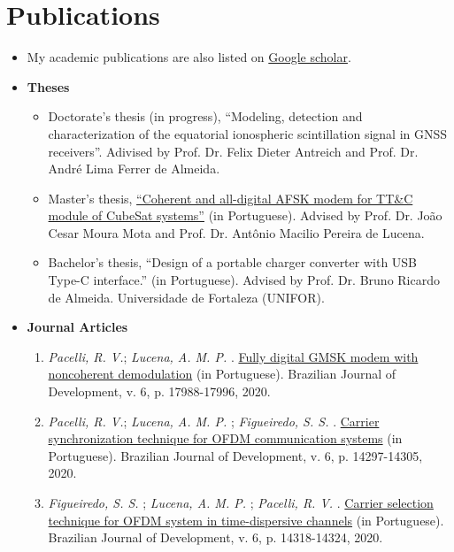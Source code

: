 \section{Publications}

\begin{itemize}[leftmargin=0.15in, label={}] %
    \item My academic publications are also listed on \href{https://scholar.google.com.br/citations?user=Kj6Gzs4AAAAJ&hl=pt-BR&oi=sra}{Google scholar}.
    \item \textbf{Theses}
    \begin{itemize}%
        \item Doctorate's thesis (in progress), ``Modeling, detection and characterization of the equatorial ionospheric scintillation signal in GNSS receivers''. Adivised by Prof. Dr. Felix Dieter Antreich and Prof. Dr. André Lima Ferrer de Almeida.
        \item Master's thesis, \href{http://repositorio.ufc.br/bitstream/riufc/60259/1/2021_dis_rvpacelli.pdf}{``Coherent and all-digital AFSK modem for TT\&C module of CubeSat systems''} (in Portuguese). Advised by Prof. Dr. João Cesar Moura Mota and Prof. Dr. Antônio Macilio Pereira de Lucena.
        \item Bachelor's thesis, ``Design of a portable charger converter with USB Type-C interface.'' (in Portuguese). Advised by Prof. Dr. Bruno Ricardo de Almeida. Universidade de Fortaleza (UNIFOR).
    \end{itemize}
    \item \textbf{Journal Articles}
    \begin{enumerate}[label=\textbf{J\arabic*.}, align=left, leftmargin=1.5cm]
        \item \textit{Pacelli, R. V.}; \textit{Lucena, A. M. P.} . \href{https://www.brazilianjournals.com/index.php/BRJD/article/view/8538/7345}{Fully digital GMSK modem with noncoherent demodulation} (in Portuguese). Brazilian Journal of Development, v. 6, p. 17988-17996, 2020.
        \item \textit{Pacelli, R. V.}; \textit{Lucena, A. M. P.} ; \textit{Figueiredo, S. S.} . \href{https://www.brazilianjournals.com/index.php/BRJD/article/view/7944/6883}{Carrier synchronization technique for OFDM communication systems} (in Portuguese). Brazilian Journal of Development, v. 6, p. 14297-14305, 2020.
        \item \textit{Figueiredo, S. S.} ; \textit{Lucena, A. M. P.} ; \textit{Pacelli, R. V.} . \href{https://www.brazilianjournals.com/index.php/BRJD/article/view/7946/6889}{Carrier selection technique for OFDM system in time-dispersive channels} (in Portuguese). Brazilian Journal of Development, v. 6, p. 14318-14324, 2020.

\end{enumerate}
\end{itemize}
